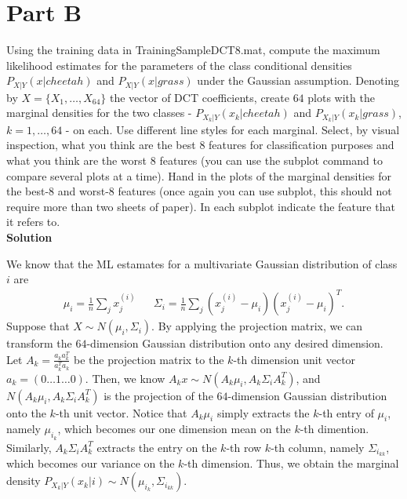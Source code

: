 \documentclass{article}
\begin{document}
\pagebreak

\section*{Part B}

Using the training data in {\selectfont TrainingSampleDCT\textunderscore8.mat}, compute the maximum likelihood estimates
for the parameters of the class conditional densities $P_{X|Y}(x|cheetah)$ and $P_{X|Y}(x|grass)$ under the
Gaussian assumption. Denoting by $X = \{X_1,\dots, X_{64}\}$ the vector of DCT coefficients, create $64$ plots
with the marginal densities for the two classes - $P_{X_k|Y} (x_k|cheetah)$ and $P_{X_k|Y} (x_k|grass)$, $k = 1,\dots, 64$
- on each. Use different line styles for each marginal. Select, by visual inspection, what you think are
the best $8$ features for classification purposes and what you think are the worst $8$ features (you can use
the subplot command to compare several plots at a time). Hand in the plots of the marginal densities
for the best-8 and worst-8 features (once again you can use subplot, this should not require more than
two sheets of paper). In each subplot indicate the feature that it refers to.
\\

\textbf{\large Solution}

We know that the ML estamates for a multivariate Gaussian distribution of class $i$ are
\begin{align*}
  \mu_i = \frac{1}{n}\sum_j x^{(i)}_j && \Sigma_i = \frac{1}{n}\sum_j (x^{(i)}_j - \mu_i)(x^{(i)}_j - \mu_i)^T.
\end{align*}
Suppose that $X \sim N(\mu_i, \Sigma_i)$. By applying the projection matrix, we can transform the $64$-dimension Gaussian distribution onto any desired dimension.
Let $A_k = \frac{a_ka_k^T}{a_k^Ta_k}$ be the projection matrix to the $k$-th dimension unit vector $a_k = (0 \dots 1 \dots 0)$.
Then, we know $A_kx \sim N(A_k\mu_i, A_k\Sigma_iA_k^T)$, and $N(A_k\mu_i, A_k\Sigma_iA_k^T)$ is the projection of the $64$-dimension Gaussian distribution onto the $k$-th unit vector.
Notice that $A_k\mu_i$ simply extracts the $k$-th entry of $\mu_i$, namely $\mu_{i_k}$, which becomes our one dimension mean on the $k$-th dimention. 
Similarly, $A_k\Sigma_iA_k^T$ extracts the entry on the $k$-th row $k$-th column, namely $\Sigma_{i_{kk}}$, which becomes our variance on the $k$-th dimension.
Thus, we obtain the marginal density $P_{X_k|Y}(x_k|i) \sim N(\mu_{i_k}, \Sigma_{i_{kk}})$.
\end{document}
